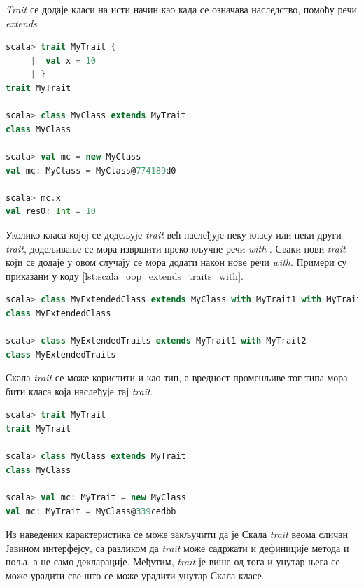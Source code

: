 \documentclass[12pt,oneside]{memoir}
\begin{document}
\textit{Trait} се додаје класи на исти начин као када се означава наследство, помоћу речи \textit{extends}. 

\begin{lstlisting}[language=Scala, caption={Додавање \textit{trait}-а класи}, label={lst:scala_oop_traits_extends_example}]
scala> trait MyTrait {
     |  val x = 10
     | }
trait MyTrait

scala> class MyClass extends MyTrait
class MyClass

scala> val mc = new MyClass
val mc: MyClass = MyClass@774189d0

scala> mc.x
val res0: Int = 10
\end{lstlisting}

Уколико класа којој се додељује \textit{trait} већ наслеђује неку класу или неки други \textit{trait}, додељивање се мора извршити преко кључне речи \textit{with} \cite{scala_prog}. Сваки нови \textit{trait} који се додаје у овом случају се мора додати након нове речи \textit{with}. Примери су приказани у коду \ref{lst:scala_oop_extends_traits_with}.

\begin{lstlisting}[language=Scala, caption={Наслеђивање више \textit{trait}-ова}, label={lst:scala_oop_extends_traits_with}]
scala> class MyExtendedClass extends MyClass with MyTrait1 with MyTrait2
class MyExtendedClass

scala> class MyExtendedTraits extends MyTrait1 with MyTrait2
class MyExtendedTraits
\end{lstlisting}

Скала \textit{trait} се може користити и као тип, а вредност променљиве тог типа мора бити класа која наслеђује тај \textit{trait}.

\begin{lstlisting}[language=Scala, caption={\textit{Trait} као тип}, label={lst:scala_oop_traits_types}]
scala> trait MyTrait
trait MyTrait

scala> class MyClass extends MyTrait
class MyClass

scala> val mc: MyTrait = new MyClass
val mc: MyTrait = MyClass@339cedbb
\end{lstlisting}

Из наведених карактеристика се може закључити да је Скала \textit{trait} веома сличан Јавином интерфејсу, са разликом да \textit{trait} може садржати и дефиниције метода и поља, а не само декларације. Међутим, \textit{trait} је више од тога и унутар њега се може урадити све што се може урадити унутар Скала класе.
\end{document}
